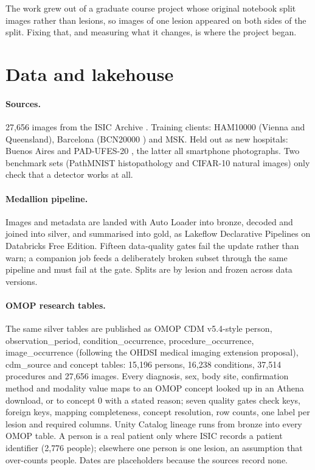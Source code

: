 \documentclass[11pt]{article}
\begin{document}
The work grew out of a graduate course project whose original notebook split images rather
than lesions, so images of one lesion appeared on both sides of the split. Fixing that, and
measuring what it changes, is where the project began.

\section{Data and lakehouse}
\paragraph{Sources.} 27{,}656 images from the ISIC Archive \cite{isic}. Training clients: HAM10000
\cite{tschandl2018} (Vienna and Queensland), Barcelona (BCN20000 \cite{combalia2019}) and MSK.
Held out as new hospitals: Buenos Aires \cite{riccilara2023} and PAD-UFES-20 \cite{pacheco2020},
the latter all smartphone photographs. Two benchmark sets (PathMNIST \cite{yang2023} histopathology
and CIFAR-10 \cite{krizhevsky2009} natural images) only check that a detector works at all.

\paragraph{Medallion pipeline.} Images and metadata are landed with Auto Loader into bronze,
decoded and joined into silver, and summarised into gold, as Lakeflow Declarative Pipelines on
Databricks Free Edition. Fifteen data-quality gates fail the update rather than warn; a
companion job feeds a deliberately broken subset through the same pipeline and must fail at
the gate. Splits are by lesion and frozen across data versions.

\paragraph{OMOP research tables.} The same silver tables are published as OMOP CDM
\cite{hripcsak2015} v5.4-style person, observation\_period, condition\_occurrence, procedure\_occurrence,
image\_occurrence (following the OHDSI medical imaging extension proposal), cdm\_source and
concept tables: 15{,}196 persons, 16{,}238 conditions, 37{,}514 procedures and 27{,}656
images. Every diagnosis, sex, body site, confirmation method and modality value maps to an
OMOP concept looked up in an Athena download, or to concept 0 with a stated reason; seven
quality gates check keys, foreign keys, mapping completeness, concept resolution, row counts,
one label per lesion and required columns. Unity Catalog lineage runs from bronze into every
OMOP table. A person is a real patient only where ISIC records a patient identifier
(2{,}776 people); elsewhere one person is one lesion, an assumption that over-counts people.
Dates are placeholders because the sources record none.
\end{document}
